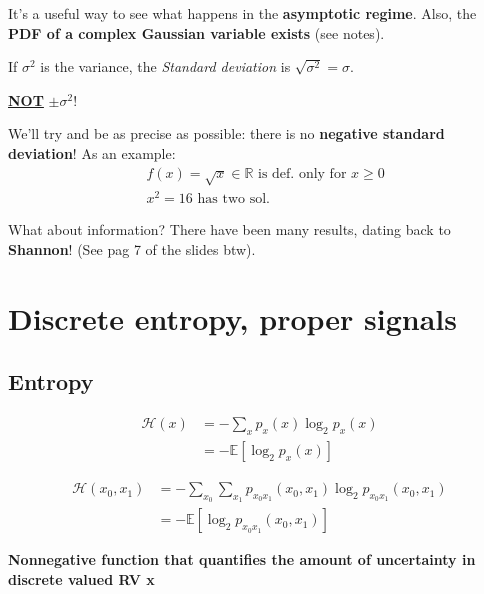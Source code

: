\documentclass[a4paper, 12pt]{book}
\begin{document}
It's a useful way to see what happens in the \textbf{asymptotic regime}.
Also, the \textbf{PDF of a complex Gaussian variable exists} (see notes).

If $\sigma^2$ is the variance, the \textit{Standard deviation} is $\sqrt{\sigma^2} = \sigma$.
\begin{center}
    \textbf{\underline{NOT}} $\pm\sigma^2!$
\end{center}

We'll try and be as precise as possible: there is no \textbf{negative standard deviation}!
As an example:
\begin{align*}
    & f(x) = \sqrt{x} \in \mathbb{R} \text{ is def. only for } x \geq 0 \\
    & x^2 = 16 \text{ has two sol.}
\end{align*}

What about information? There have been many results, dating back to \textbf{Shannon}! (See pag 7 of the slides btw).

\section{Discrete entropy, proper signals}

\subsection{Entropy}

\begin{definition}
\begin{align*}
    \mathcal{H}(x) &= -\sum_{x} p_x(x) \log_2 p_x(x) \\
                   &= -\mathbb{E}[\log_2 p_x(x)]
\end{align*}
\end{definition}

\begin{definition}
\begin{align*}
    \mathcal{H}(x_0, x_1) &= -\sum_{x_0}\sum_{x_1} p_{x_0 x_1}(x_0, x_1) \log_2 p_{x_0 x_1}(x_0, x_1) \\
                          &= -\mathbb{E}[\log_2 p_{x_0 x_1}(x_0, x_1)]
\end{align*}
\end{definition}

\begin{greenbar}
    \textbf{Nonnegative function that quantifies the amount of uncertainty in discrete valued RV x}
\end{greenbar}
\end{document}
